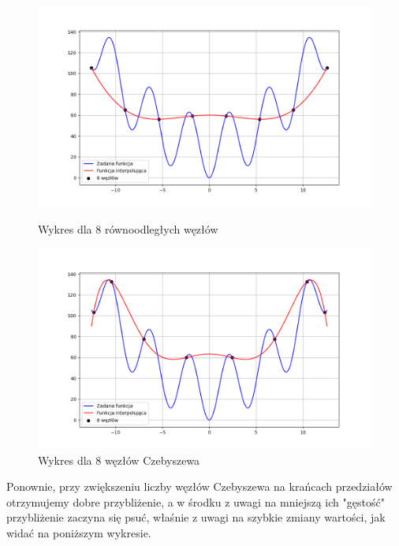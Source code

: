 \documentclass{article}
\begin{document}
\begin{figure}[H]
  \begin{minipage}[b]{0.49\textwidth}
    \includegraphics[width=\textwidth]{img05_n=8.png}
    \caption{Wykres dla 8 równoodległych węzłów}
  \end{minipage}
  \hfill
  \begin{minipage}[b]{0.49\textwidth}
    \includegraphics[width=\textwidth]{img06_n=8.png}
    \caption{Wykres dla 8 węzłów Czebyszewa}
  \end{minipage}
\end{figure}

Ponownie, przy zwiększeniu liczby węzłów Czebyszewa na krańcach przedziałów otrzymujemy dobre przybliżenie, a w środku z uwagi na mniejszą ich "gęstość" przybliżenie zaczyna się psuć, właśnie z uwagi na szybkie zmiany wartości, jak widać na poniższym wykresie.
\end{document}
